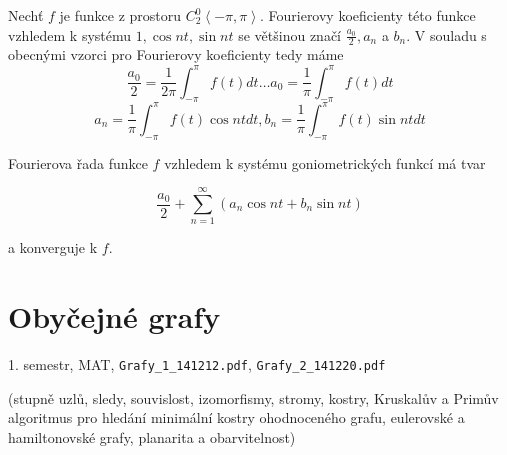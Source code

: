 \documentclass[a4paper, 11pt]{report}
\newtheorem{veta}{Věta}[chapter]
\begin{document}
Nechť $f$ je funkce z prostoru $C_2^0\left<-\pi, \pi\right>$. Fourierovy koeficienty této funkce vzhledem k systému $1, \cos nt, \sin nt$ se většinou značí $\frac{a_0}{2}, a_n$ a $b_n$.
V souladu s obecnými vzorci pro Fourierovy koeficienty tedy máme
$$\frac{a_0}{2} = \frac{1}{2 \pi} \int_{-\pi}^\pi f(t) dt \dots a_0 = \frac{1}{\pi} \int_{-\pi}^\pi f(t) dt$$
$$a_n = \frac{1}{\pi} \int_{-\pi}^\pi f(t) \cos nt dt, b_n = \frac{1}{\pi} \int_{-\pi}^\pi f(t) \sin nt dt$$

Fourierova řada funkce $f$ vzhledem k systému goniometrických funkcí má tvar

$$\frac{a_0}{2} + \sum\limits_{n=1}^\infty (a_n \cos nt + b_n \sin nt)$$

a konverguje k $f$.

\begin{comment}
\section{Úplné unitární prostoru. Rieszova-Fischerova věta}

\begin{veta}
(Riesz-Fischer). Nechť $\{\varphi_n\}$ je libovolný ortonormální systém v úplném unitárním prostoru R a nechť čísla $c_1, c_2, \dots, c_n, \dots$ jsou taková, že řada
$$\sum\limits_{k=1}^\infty c_k^2$$
konverguje. Potom existuje takový prvek $f \in R$, že $c_k = (f, \varphi_k)$ a
$$\sum\limits_{k=1}^\infty (f, f) = ||f||^2$$
\end{comment}




















\chapter{Obyčejné grafy} \label{cha:14}

1. semestr, MAT, \texttt{Grafy\_1\_141212.pdf}, \texttt{Grafy\_2\_141220.pdf}

(stupně uzlů, sledy, souvislost, izomorfismy, stromy, kostry, Kruskalův a Primův algoritmus pro hledání minimální kostry ohodnoceného grafu, eulerovské a hamiltonovské grafy, planarita a obarvitelnost)
\end{document}
